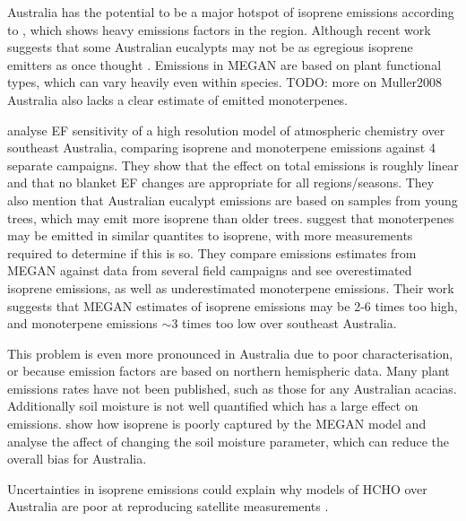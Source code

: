     Australia has the potential to be a major hotspot of isoprene emissions according to \cite{Guenther2006,Guenther2012}, which shows heavy emissions factors in the region.
    Although recent work suggests that some Australian eucalypts may not be as egregious isoprene emitters as once thought \cite{Emmerson2016}.
    Emissions in MEGAN are based on plant functional types, which can vary heavily even within species.
    TODO: more on Muller2008
    Australia also lacks a clear estimate of emitted monoterpenes.
    
    
    \cite{Emmerson2016} analyse EF sensitivity of a high resolution model of atmospheric chemistry over southeast Australia, comparing isoprene and monoterpene emissions against 4 separate campaigns.
    They show that the effect on total emissions is roughly linear and that no blanket EF changes are appropriate for all regions/seasons.
    They also mention that Australian eucalypt emissions are based on samples from young trees, which may emit more isoprene than older trees.
    \cite{Emmerson2016} suggest that monoterpenes may be emitted in similar quantites to isoprene, with more measurements required to determine if this is so.
    They compare emissions estimates from MEGAN against data from several field campaigns and see overestimated isoprene emissions, as well as underestimated monoterpene emissions.
    Their work suggests that MEGAN estimates of isoprene emissions may be 2-6 times too high, and monoterpene emissions $\sim3$ times too low over southeast Australia.
    
    This problem is even more pronounced in Australia due to poor characterisation, or because emission factors are based on northern hemispheric data.
    Many plant emissions rates have not been published, such as those for any Australian acacias.
    Additionally soil moisture is not well quantified which has a large effect on emissions.
    \cite{Muller2008} show how isoprene is poorly captured by the MEGAN model and analyse the affect of changing the soil moisture parameter, which can reduce the overall bias for Australia.
    
    Uncertainties in isoprene emissions could explain why models of HCHO over Australia are poor at reproducing satellite measurements \citep{Stavrakou2009}.
    
    
    
